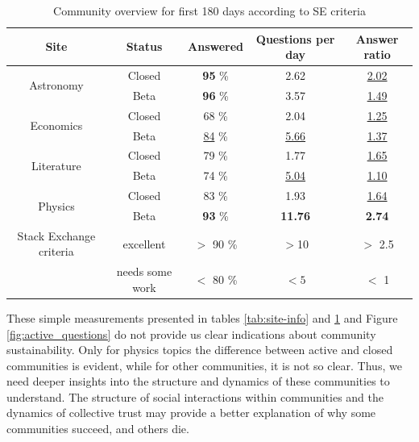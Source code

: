 \begin{table}[h!]
	\caption{Community overview for first 180 days according to SE criteria  }
	
	\label{tab:se_c}
	\begin{tabular}{ccccc}
		\hline
		
		Site & Status &  Answered & Questions per day & Answer ratio \\ \hline
		\multirow{2}{*}{Astronomy} & \multicolumn{1}{c|}{Closed} & \multicolumn{1}{c|}{\textbf{95} \%}  & \multicolumn{1}{c|}{2.62} & \multicolumn{1}{c}{\underline{2.02}} \\
		& \multicolumn{1}{c|}{Beta} & \multicolumn{1}{c|}{\textbf{96} \%}  & \multicolumn{1}{c|}{3.57} & \multicolumn{1}{c}{\underline{1.49}} \\ \hline
		\multirow{2}{*}{Economics} & \multicolumn{1}{c|}{Closed} & \multicolumn{1}{c|}{68 \%}  & \multicolumn{1}{c|}{2.04} & \multicolumn{1}{c}{\underline{1.25}} \\
		& \multicolumn{1}{c|}{Beta} & \multicolumn{1}{c|}{\underline{84} \%}  & \multicolumn{1}{c|}{\underline{5.66}} & \multicolumn{1}{c}{\underline{1.37}} \\ \hline
		\multirow{2}{*}{Literature} & \multicolumn{1}{c|}{Closed} & \multicolumn{1}{c|}{79 \%}  & \multicolumn{1}{c|}{1.77} & \multicolumn{1}{c}{\underline{1.65}} \\
		& \multicolumn{1}{c|}{Beta} & \multicolumn{1}{c|}{74 \%}  & \multicolumn{1}{c|}{\underline{5.04}} & \multicolumn{1}{c}{\underline{1.10}} \\ \hline
		\multirow{2}{*}{Physics} & \multicolumn{1}{c|}{Closed} & \multicolumn{1}{c|}{83 \%}  & \multicolumn{1}{c|}{1.93} & \multicolumn{1}{c}{\underline{1.64}} \\
		& \multicolumn{1}{c|}{Beta} & \multicolumn{1}{c|}{\textbf{93} \%}  & \multicolumn{1}{c|}{\textbf{11.76}} & \multicolumn{1}{c}{ \textbf{2.74}} \\ \hline \hline
		{Stack Exchange criteria} & excellent & $>$ 90 \% & $>$10 & $>$ 2.5   \\
		& needs some work & $<$ 80 \% & $<5$ & $<$ 1   \\ \hline
		
		
	\end{tabular}
	
\end{table}

These simple measurements presented in tables \ref{tab:site-info} and \ref{tab:se_c} and Figure \ref{fig:active_questions} do not provide us clear indications about community sustainability. Only for physics topics the difference between active and closed communities is evident, while for other communities, it is not so clear. Thus, we need deeper insights into the structure and dynamics of these communities to understand. The structure of social interactions within communities and the dynamics of collective trust may provide a better explanation of why some communities succeed, and others die. 